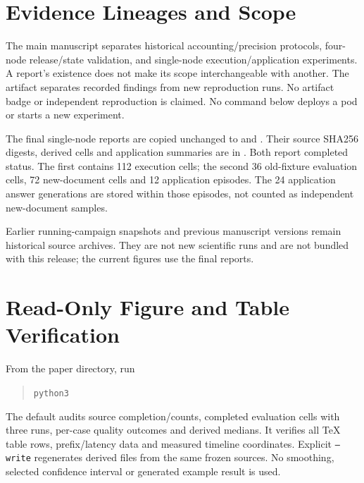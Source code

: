 \documentclass{article}
\begin{document}
\appendix
\section{Evidence Lineages and Scope}
The main manuscript separates historical accounting/precision protocols,
four-node release/state validation, and single-node execution/application
experiments. A report's existence does not make its scope interchangeable with
another. The artifact separates recorded findings from new reproduction runs. No
artifact badge or independent reproduction is claimed.
No command below deploys a pod or starts a new experiment.

The final single-node reports are copied unchanged to
 and
.
Their source SHA256 digests, derived cells and application summaries are in
. Both report completed status. The first contains
112 execution cells; the second 36 old-fixture evaluation cells, 72 new-document
cells and 12 application episodes. The 24 application answer generations are
stored within those episodes, not counted as independent new-document samples.

Earlier running-campaign snapshots and previous manuscript versions remain
historical source archives. They are not new scientific runs and are not
bundled with this release; the current figures use the final reports.

\section{Read-Only Figure and Table Verification}
From the paper directory, run
\begin{quote}
\texttt{python3}\\
\end{quote}
The default audits source completion/counts, completed evaluation cells with three runs,
per-case quality outcomes and derived medians. It verifies all TeX table rows,
prefix/latency data and measured timeline coordinates. Explicit
\texttt{--write} regenerates derived files from the same frozen sources.
No smoothing, selected confidence interval or generated example result is used.
\end{document}
